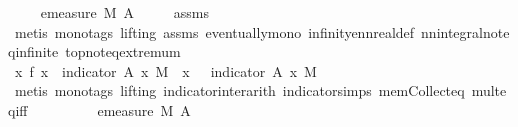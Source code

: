 \begin{isabellebody}
\ \ \isamarkupfalse%
\ {\isacharasterisk}{\kern0pt}{\isacharcolon}{\kern0pt}\ {\isachardoublequoteopen}emeasure\ M\ {\isacharquery}{\kern0pt}A\ {\isachargreater}{\kern0pt}\ {}{\isachardoublequoteclose}\ \isamarkupfalse%
\ {}\ assms{\isacharparenleft}{\kern0pt}{}{\isacharparenright}{\kern0pt}\ \isamarkupfalse%
\ {\isacharparenleft}{\kern0pt}metis\ {\isacharparenleft}{\kern0pt}mono{\isacharunderscore}{\kern0pt}tags{\isacharcomma}{\kern0pt}\ lifting{\isacharparenright}{\kern0pt}\ assms{\isacharparenleft}{\kern0pt}{}{\isacharparenright}{\kern0pt}\ eventually{\isacharunderscore}{\kern0pt}mono\ infinity{\isacharunderscore}{\kern0pt}ennreal{\isacharunderscore}{\kern0pt}def\ nn{\isacharunderscore}{\kern0pt}integral{\isacharunderscore}{\kern0pt}noteq{\isacharunderscore}{\kern0pt}infinite\ top{\isachardot}{\kern0pt}not{\isacharunderscore}{\kern0pt}eq{\isacharunderscore}{\kern0pt}extremum{\isacharparenright}{\kern0pt}\isanewline
\ \ \isamarkupfalse%
\ {\isachardoublequoteopen}{\isacharparenleft}{\kern0pt}{\isasymintegral}\isactrlsup {\isacharplus}{\kern0pt}x{\isachardot}{\kern0pt}\ f\ x\ {\isacharasterisk}{\kern0pt}\ indicator\ {\isacharquery}{\kern0pt}A\ x\ {\isasympartial}M{\isacharparenright}{\kern0pt}\ {\isacharequal}{\kern0pt}\ {\isacharparenleft}{\kern0pt}{\isasymintegral}\isactrlsup {\isacharplus}{\kern0pt}x{\isachardot}{\kern0pt}\ {\isasyminfinity}\ {\isacharasterisk}{\kern0pt}\ indicator\ {\isacharquery}{\kern0pt}A\ x\ {\isasympartial}M{\isacharparenright}{\kern0pt}{\isachardoublequoteclose}\ \isamarkupfalse%
\ {\isacharparenleft}{\kern0pt}metis\ {\isacharparenleft}{\kern0pt}mono{\isacharunderscore}{\kern0pt}tags{\isacharcomma}{\kern0pt}\ lifting{\isacharparenright}{\kern0pt}\ indicator{\isacharunderscore}{\kern0pt}inter{\isacharunderscore}{\kern0pt}arith\ indicator{\isacharunderscore}{\kern0pt}simps{\isacharparenleft}{\kern0pt}{}{\isacharparenright}{\kern0pt}\ mem{\isacharunderscore}{\kern0pt}Collect{\isacharunderscore}{\kern0pt}eq\ mult{\isacharunderscore}{\kern0pt}eq{\isacharunderscore}{\kern0pt}{}{\isacharunderscore}{\kern0pt}iff{\isacharparenright}{\kern0pt}\isanewline
\ \ \isamarkupfalse%
\ \isamarkupfalse%
\ {\isachardoublequoteopen}{\isachardot}{\kern0pt}{\isachardot}{\kern0pt}{\isachardot}{\kern0pt}\ {\isacharequal}{\kern0pt}\ {\isasyminfinity}\ {\isacharasterisk}{\kern0pt}\ emeasure\ M\ {\isacharquery}{\kern0pt}A{\isachardoublequoteclose}\ \isamarkupfalse%

\end{isabellebody}
